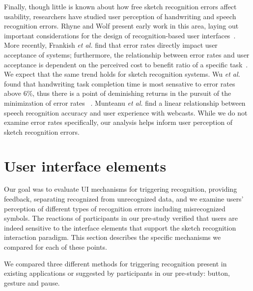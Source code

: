 \documentclass{egpubl}
\begin{document}
Finally, though little is known about how free sketch recognition
errors affect usability, researchers have studied user perception of
handwriting and speech recognition errors.  Rhyne and Wolf present
early work in this area, laying out important considerations for the
design of recognition-based user
interfaces~\cite{Rhyne1993Recognition}.  More recently, Frankish
\textit{et al.} find that error rates directly impact user acceptance
of systems; furthermore, the relationship between error rates and user
acceptance is dependent on the perceived cost to benefit ratio of a
specific task~\cite{Frankish95RecogAccuracy}.  We expect that the same
trend holds for sketch recognition systems.  Wu \textit{et al.} found
that handwriting task completion time is most sensative to error rates
above 6\%, thus there is a point of deminishing returns in the pursuit
of the minimization of error rates ~\cite{Wu03ChineseCharacterRecog}.
Munteanu \textit{et al.} find a linear relationship between speech
recognition accuracy and user experience with webcasts.  While we do
not examine error rates specifically, our analysis helps inform user
perception of sketch recognition errors.

\section{User interface elements}

Our goal was to evaluate UI mechanisms for triggering recognition, providing
feedback, separating recognized from unrecognized data, and we examine
users' perception of different types of recognition errors including
misrecognized symbols.  The reactions of participants in our pre-study
verified that users are indeed sensitive to the interface elements
that support the sketch recognition interaction paradigm.  This
section describes the specific mechanisms we compared for each of
these points.


We compared three different methods for triggering recognition present
in existing applications or suggested by participants in our pre-study:
button, gesture and pause.  
\end{document}
